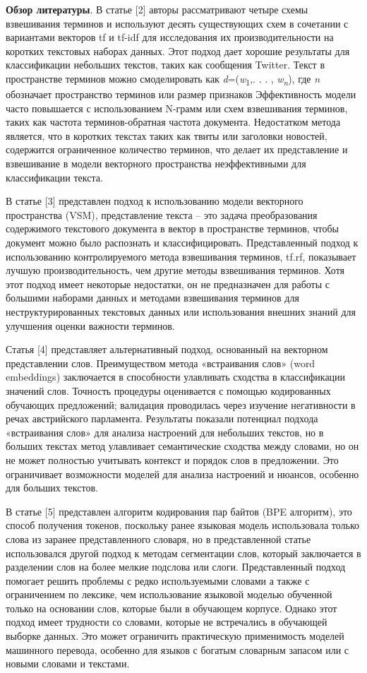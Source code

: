 {\bfseries Обзор литературы}. В статье {[}2{]} авторы рассматривают четыре
схемы взвешивания терминов и используют десять существующих схем в
сочетании с вариантами векторов tf и tf-idf для исследования их
производительности на коротких текстовых наборах данных. Этот подход
дает хорошие результаты для классификации небольших текстов, таких как
сообщения Twitter. Текст в пространстве терминов можно смоделировать как
\emph{d}=(\emph{w}\textsubscript{1},. . . , \emph{w\textsubscript{n}}),
где \emph{n} обозначает пространство терминов или размер признаков
Эффективность модели часто повышается с использованием N-грамм или схем
взвешивания терминов, таких как частота терминов-обратная частота
документа. Недостатком метода является, что в коротких текстах таких как
твиты или заголовки новостей, содержится ограниченное количество
терминов, что делает их представление и взвешивание в модели векторного
пространства неэффективными для классификации текста.

В статье {[}3{]} представлен подход к использованию модели векторного
пространства (VSM), представление текста -- это задача преобразования
содержимого текстового документа в вектор в пространстве терминов, чтобы
документ можно было распознать и классифицировать. Представленный подход
к использованию контролируемого метода взвешивания терминов, tf.rf,
показывает лучшую производительность, чем другие методы взвешивания
терминов. Хотя этот подход имеет некоторые недостатки, он не
предназначен для работы с большими наборами данных и методами
взвешивания терминов для неструктурированных текстовых данных или
использования внешних знаний для улучшения оценки важности терминов.

Статья {[}4{]} представляет альтернативный подход, основанный на
векторном представлении слов. Преимуществом метода «встраивания слов»
(word embeddings) заключается в способности улавливать сходства в
классификации значений слов. Точность процедуры оценивается с помощью
кодированных обучающих предложений; валидация проводилась через изучение
негативности в речах австрийского парламента. Результаты показали
потенциал подхода «встраивания слов» для анализа настроений для
небольших текстов, но в больших текстах метод улавливает семантические
сходства между словами, но он не может полностью учитывать контекст и
порядок слов в предложении. Это ограничивает возможности моделей для
анализа настроений и нюансов, особенно для больших текстов.

В статье {[}5{]} представлен алгоритм кодирования пар байтов (BPE
алгоритм), это способ получения токенов, поскольку ранее языковая модель
использовала только слова из заранее представленного словаря, но в
представленной статье использовался другой подход к методам сегментации
слов, который заключается в разделении слов на более мелкие подслова или
слоги. Представленный подход помогает решить проблемы с редко
используемыми словами а также с ограничением по лексике, чем
использование языковой моделью обученной только на основании слов,
которые были в обучающем корпусе. Однако этот подход имеет трудности со
словами, которые не встречались в обучающей выборке данных. Это может
ограничить практическую применимость моделей машинного перевода,
особенно для языков с богатым словарным запасом или с новыми словами и
текстами.


